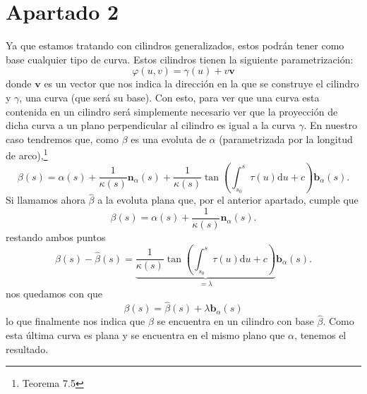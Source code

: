 \section{Apartado 2}
Ya que estamos tratando con cilindros generalizados, estos podrán tener como
base cualquier tipo de curva. Estos cilindros tienen la siguiente
parametrización:
\[
\varphi \left( u, v \right) = \gamma\left( u \right) + v \mathbf{v}
\]
donde $\mathbf{v}$ es un vector que nos indica la dirección en la que se
construye el cilindro y $\gamma$, una curva (que será su base). Con esto, para
ver que una curva esta contenida en un cilindro será simplemente necesario ver
que la proyección de dicha curva a un plano perpendicular al cilindro es igual a
la curva $\gamma$. En nuestro caso tendremos que, como $\beta$ es una evoluta de
$\alpha$ (parametrizada por la longitud de arco),\footnote{Teorema
7.5\cite{sanjurjo}}
\[
\beta\left( s \right) = \alpha\left( s \right) + \frac{1}{\kappa\left( s
\right)}\mathbf{n}_{\alpha}\left( s \right) + \frac{1}{\kappa\left( s \right)}
\tan\left( \int_{s_0}^{s} \tau\left( u \right) \mathrm{d}u + c \right)
\mathbf{b}_{\alpha}\left( s \right).
\]
Si llamamos ahora $\hat{\beta}$ a la evoluta plana que, por el anterior
apartado, cumple que
\[
\beta\left( s \right) = \alpha\left( s \right) + \frac{1}{\kappa\left( s
\right)} \mathbf{n}_{\alpha}\left( s \right).
\]
restando ambos puntos
\[
\beta\left( s \right) - \hat{\beta}\left( s \right) =
\underbrace{\frac{1}{\kappa\left( s \right)} \tan\left( \int_{s_0}^{s}
\tau\left( u \right) \mathrm{d}u + c \right)}_{= \lambda}
\mathbf{b}_{\alpha}\left( s \right).
\]
nos quedamos con que
\[
\beta\left( s \right) = \hat{\beta}\left( s \right) + \lambda
\mathbf{b}_{\alpha}\left( s \right)
\]
lo que finalmente nos indica que $\beta$ se encuentra en un cilindro con base
$\hat{\beta}$. Como esta última curva es plana y se encuentra en el mismo plano
que $\alpha$, tenemos el resultado.
